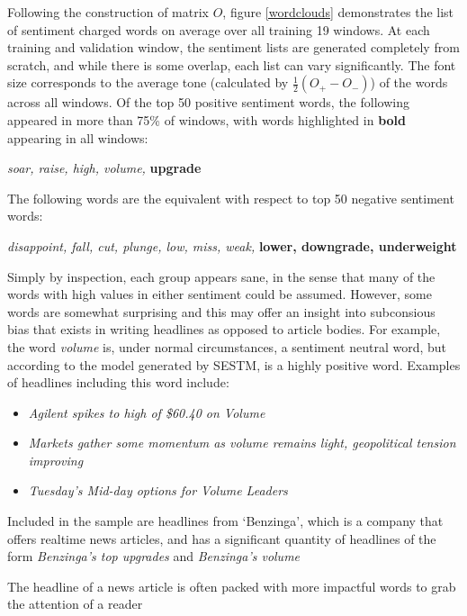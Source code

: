 \documentclass[ oneside,%
                    author={Joshua Felmeden},
                    degree={MEng},
                     title={Semantic Analysis of Financial Headlines Based on Realised Stock Returns},
                  subtitle={}]{dissertation}
\begin{document}
Following the construction of matrix $O$, figure \ref{wordclouds} demonstrates the list of sentiment charged words on average over all training 19 windows. At each training and validation window, the sentiment lists are generated completely from scratch, and while there is some overlap, each list can vary significantly. The font size corresponds to the average tone (calculated by $\frac{1}{2}(O_+ - O_-)$) of the words across all windows. Of the top 50 positive sentiment words, the following appeared in more than 75\% of windows, with words highlighted in \textbf{bold} appearing in all windows:
\begin{center}
      \textit{soar, raise, high, volume,} \textbf{upgrade}
\end{center}

\noindent
The following words are the equivalent with respect to top 50 negative sentiment words:
\begin{center}
      \textit{disappoint, fall, cut, plunge, low, miss, weak,} \textbf{lower, downgrade, underweight}
\end{center}

Simply by inspection, each group appears sane, in the sense that many of the words with high values in either sentiment could be assumed. However, some words are somewhat surprising and this may offer an insight into subconsious bias that exists in writing headlines as opposed to article bodies. For example, the word \textit{volume} is, under normal circumstances, a sentiment neutral word, but according to the model generated by SESTM, is a highly positive word. Examples of headlines including this word include:
\begin{itemize}
      \item \textit{Agilent spikes to high of \$60.40 on Volume}
      \item \textit{Markets gather some momentum as volume remains light, geopolitical tension improving}
      \item \textit{Tuesday's Mid-day options for Volume Leaders}
\end{itemize}

Included in the sample are headlines from `Benzinga', which is a company that offers realtime news articles, and has a significant quantity of headlines of the form \textit{Benzinga's top upgrades} and \textit{Benzinga's volume}

The headline of a news article is often packed with more impactful words to grab the attention of a reader 
\end{document}
